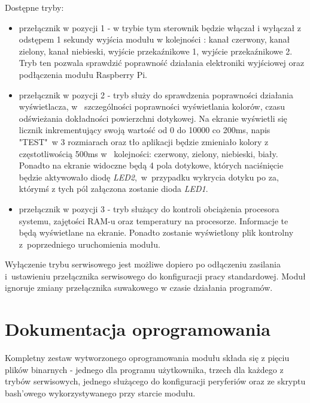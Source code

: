 \documentclass[12pt, eng, twoside, openany, final]{mgr}
\begin{document}
            Dostępne tryby:
            \begin{itemize}
                \item przełącznik w pozycji 1 - w trybie tym sterownik będzie włączał i wyłączał z odstępem 1 sekundy wyjścia modułu w kolejności : kanał czerwony, kanał zielony, kanał niebieski, wyjście przekaźnikowe 1, wyjście przekaźnikowe 2. Tryb ten pozwala sprawdzić poprawność działania elektroniki wyjściowej oraz podłączenia modułu Raspberry Pi.
                
                \item przełącznik w pozycji 2 - tryb służy do sprawdzenia poprawności działania wyświetlacza, w~ szczególności poprawności wyświetlania kolorów, czasu odświeżania dokładności powierzchni dotykowej.
                Na ekranie wyświetli się licznik inkrementujący swoją wartość od 0 do 10000 co 200ms, napis "TEST"~w 3 rozmiarach oraz tło aplikacji będzie zmieniało kolory z częstotliwością 500ms w~ kolejności: czerwony, zielony, niebieski, biały. Ponadto na ekranie widoczne będą 4 pola dotykowe, których naciśnięcie będzie aktywowało diodę \emph{LED2},~w~przypadku wykrycia dotyku po za, którymś z tych pól załączona zostanie dioda \emph{LED1}. 
                
                \item przełącznik w pozycji 3 - tryb służący do kontroli obciążenia procesora systemu, zajętości RAM-u oraz temperatury na procesorze. Informacje te będą wyświetlane na ekranie. Ponadto zostanie wyświetlony plik kontrolny z~poprzedniego uruchomienia modułu.
            \end{itemize}
            
            Wyłączenie trybu serwisowego jest możliwe dopiero po odłączeniu zasilania i~ustawieniu przełącznika serwisowego do konfiguracji pracy standardowej.
            Moduł ignoruje zmiany przełącznika suwakowego w czasie działania programów.
            
            \newpage
            
            \section{Dokumentacja oprogramowania}
            Kompletny zestaw wytworzonego oprogramowania modułu składa się z pięciu plików binarnych - jednego dla programu użytkownika, trzech dla każdego z trybów serwisowych, jednego służącego do konfiguracji peryferiów oraz ze skryptu bash'owego wykorzystywanego przy starcie modułu.
            
\end{document}
